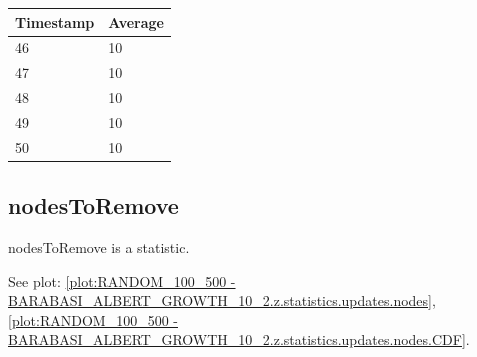 \begin{tabular}{|l||l|}
\hline
	\textbf{Timestamp} & \textbf{Average} \\ \hline
	46 & 10 \\ \hline
	47 & 10 \\ \hline
	48 & 10 \\ \hline
	49 & 10 \\ \hline
	50 & 10 \\ \hline
\end{tabular}

\subsection{nodesToRemove}
nodesToRemove is a statistic.

See plot: \ref{plot:RANDOM_100_500 - BARABASI_ALBERT_GROWTH_10_2.z.statistics.updates.nodes}, \ref{plot:RANDOM_100_500 - BARABASI_ALBERT_GROWTH_10_2.z.statistics.updates.nodes.CDF}.

